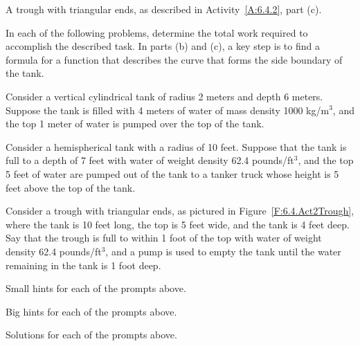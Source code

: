\begin{marginfigure}[1cm] %
\caption{A trough with triangular ends, as described in Activity~\ref{A:6.4.2}, part (c).} \label{F:6.4.Act2Trough}
\end{marginfigure}

\begin{activity} \label{A:6.5.2}  In each of the following problems, determine the total work required to accomplish the described task.  In parts (b) and (c), a key step is to find a formula for a function that describes the curve that forms the side boundary of the tank.

\ba
	\item Consider a vertical cylindrical tank of radius 2 meters and depth 6 meters.  Suppose the tank is filled with 4 meters of water of mass density 1000 kg/m$^3$, and the top 1 meter of water is pumped over the top of the tank.
	\item Consider a hemispherical tank with a radius of 10 feet.  Suppose that the tank is full to a depth of 7 feet with water of weight density 62.4 pounds/ft$^3$, and the top 5 feet of water are pumped out of the tank to a tanker truck whose height is 5 feet above the top of the tank.
	\item Consider a trough with triangular ends, as pictured in Figure~\ref{F:6.4.Act2Trough}, where the tank is 10 feet long, the top is 5 feet wide, and the tank is 4 feet deep.  Say that the trough is full to within 1 foot of the top with water of weight density 62.4 pounds/ft$^3$, and a pump is used to empty the tank until the water remaining in the tank is 1 foot deep.
\ea

\end{activity}
\begin{smallhint}
\ba
	\item Small hints for each of the prompts above.
\ea
\end{smallhint}
\begin{bighint}
\ba
	\item Big hints for each of the prompts above.
\ea
\end{bighint}
\begin{activitySolution}
\ba
	\item Solutions for each of the prompts above.
\ea
\end{activitySolution}
\aftera